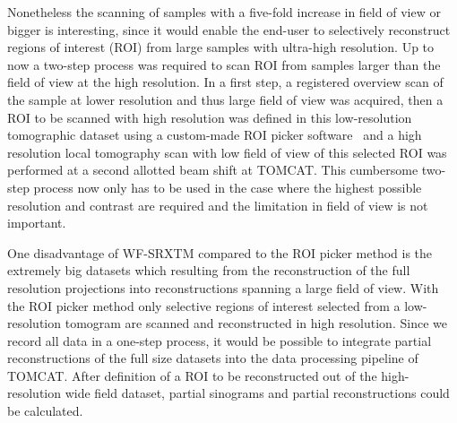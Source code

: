 Nonetheless the scanning of samples with a five-fold increase in field of view or bigger is interesting, since it would enable the end-user to selectively reconstruct regions of interest (ROI) from large samples with ultra-high resolution. Up to now a two-step process was required to scan ROI from samples larger than the field of view at the high resolution. In a first step, a registered overview scan of the sample at lower resolution and thus large field of view was acquired, then a ROI to be scanned with high resolution was defined in this low-resolution tomographic dataset using a custom-made ROI picker software~\cite{Heinzer2008} and a high resolution local tomography scan with low field of view of this selected ROI was performed at a second allotted beam shift at TOMCAT. This cumbersome two-step process now only has to be used in the case where the highest possible resolution and contrast are required and the limitation in field of view is not important.

One disadvantage of WF-SRXTM compared to the ROI picker method is the extremely big datasets which resulting from the reconstruction of the full resolution projections into reconstructions spanning a large field of view. With the ROI picker method only selective regions of interest selected from a low-resolution tomogram are scanned and reconstructed in high resolution. Since we record all data in a one-step process, it would be possible to integrate partial reconstructions of the full size datasets into the data processing pipeline of TOMCAT. After definition of a ROI to be reconstructed out of the high-resolution wide field dataset, partial sinograms and partial reconstructions could be calculated.